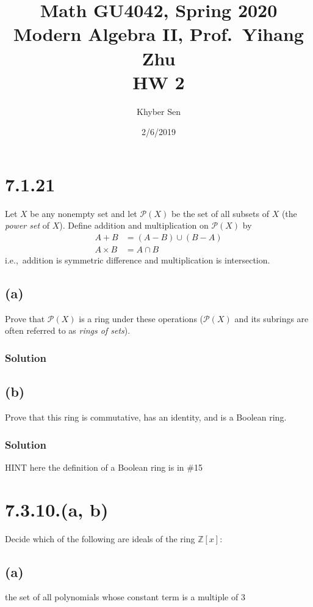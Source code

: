 \documentclass[fleqn]{article}
\title{
Math GU4042, Spring 2020 \\
Modern Algebra II, Prof.\ Yihang Zhu \\
HW 2
}
\author{Khyber Sen}
\date{2/6/2019}
\begin{document}
    
    \maketitle
    
    \section{7.1.21}
    Let $X$ be any nonempty set and let $\mathcal{P}(X)$ be the set of all subsets of $X$ (the \textit{power set} of $X$).  Define addition and multiplication on $\mathcal{P}(X)$ by
    \begin{align}
        A + B &= (A - B) \cup (B - A) \\
        A \times B &= A \cap B
    \end{align}
    i.e.,\ addition is symmetric difference and multiplication is intersection.
        
        \subsection{(a)}
        Prove that $\mathcal{P}(X)$ is a ring under these operations ($\mathcal{P}(X)$ and its subrings are often referred to as \textit{rings of sets}).
            
            \subsubsection{Solution}
            
        
        \subsection{(b)}
        Prove that this ring is commutative, has an identity, and is a Boolean ring.
        
            \subsubsection{Solution}
            
    
    HINT here the definition of a Boolean ring is in \#15
    
    \section{7.3.10.(a, b)}
    Decide which of the following are ideals of the ring $\mathbb{Z}[x]$:
        
        \subsection{(a)}
        the set of all polynomials whose constant term is a multiple of 3
            
\end{document}
